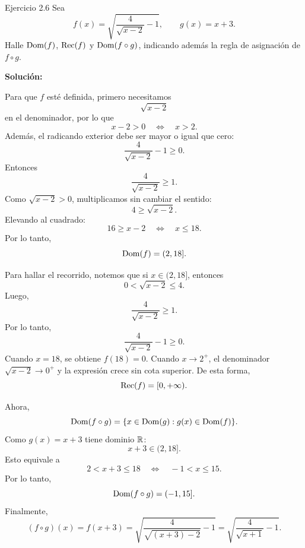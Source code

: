 \documentclass[letterpaper, 12pt]{article}
\begin{document}
\begin{solucionbox}{Ejercicio 2.6}
Sea
\[
    f(x)=\sqrt{\frac{4}{\sqrt{x-2}}-1},
    \qquad
    g(x)=x+3.
\]
Halle $\operatorname{Dom}(f)$, $\operatorname{Rec}(f)$ y $\operatorname{Dom}(f\circ g)$, indicando adem\'as la regla de asignaci\'on de $f\circ g$.

\textbf{Soluci\'on:}

Para que $f$ est\'e definida, primero necesitamos
\[
    \sqrt{x-2}
\]
en el denominador, por lo que
\[
    x-2>0
    \quad\Longleftrightarrow\quad
    x>2.
\]
Adem\'as, el radicando exterior debe ser mayor o igual que cero:
\[
    \frac{4}{\sqrt{x-2}}-1\geq 0.
\]
Entonces
\[
    \frac{4}{\sqrt{x-2}}\geq 1.
\]
Como $\sqrt{x-2}>0$, multiplicamos sin cambiar el sentido:
\[
    4\geq \sqrt{x-2}.
\]
Elevando al cuadrado:
\[
    16\geq x-2
    \quad\Longleftrightarrow\quad
    x\leq 18.
\]
Por lo tanto,
\[
    \operatorname{Dom}(f)=(2,18].
\]

Para hallar el recorrido, notemos que si $x\in(2,18]$, entonces
\[
    0<\sqrt{x-2}\leq 4.
\]
Luego,
\[
    \frac{4}{\sqrt{x-2}}\geq 1.
\]
Por lo tanto,
\[
    \frac{4}{\sqrt{x-2}}-1\geq 0.
\]
Cuando $x=18$, se obtiene $f(18)=0$. Cuando $x\to 2^+$, el denominador $\sqrt{x-2}\to0^+$ y la expresi\'on crece sin cota superior. De esta forma,
\[
    \operatorname{Rec}(f)=[0,+\infty).
\]

Ahora,
\[
    \operatorname{Dom}(f\circ g)=\{x\in\operatorname{Dom}(g):g(x)\in\operatorname{Dom}(f)\}.
\]
Como $g(x)=x+3$ tiene dominio $\mathbb{R}$:
\[
    x+3\in(2,18].
\]
Esto equivale a
\[
    2<x+3\leq 18
    \quad\Longleftrightarrow\quad
    -1<x\leq 15.
\]
Por lo tanto,
\[
    \operatorname{Dom}(f\circ g)=(-1,15].
\]
Finalmente,
\[
    (f\circ g)(x)=f(x+3)
    =\sqrt{\frac{4}{\sqrt{(x+3)-2}}-1}
    =\sqrt{\frac{4}{\sqrt{x+1}}-1}.
\]

\respuesta{$\Dom(f)=(2,18]$, $\Rec(f)=[0,+\infty)$, $\Dom(f\circ g)=(-1,15]$ y $(f\circ g)(x)=\sqrt{\dfrac{4}{\sqrt{x+1}}-1}$.}
\end{solucionbox}
\end{document}
